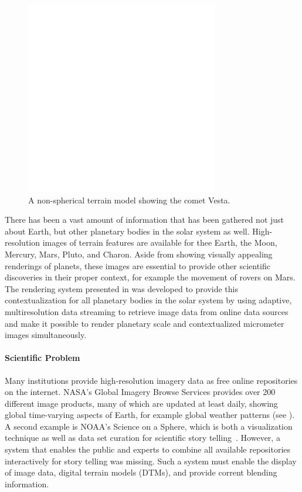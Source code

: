 \begin{figure}
\centering
\includegraphics[width=0.75\textwidth]{figures/empty.png}
\caption{A non-spherical terrain model showing the comet Vesta.}
\label{contributions:astro:gb:vesta}
\end{figure}

There has been a vast amount of information that has been gathered not just about Earth, but other planetary bodies in the solar system as well.  High-resolution images of terrain features are available for thee Earth, the Moon, Mercury, Mars, Pluto, and Charon.  Aside from showing visually appealing renderings of planets, these images are essential to provide other scientific discoveries in their proper context, for example the movement of rovers on Mars.  The rendering system presented in  was developed to provide this contextualization for all planetary bodies in the solar system by using adaptive, multiresolution data streaming to retrieve image data from online data sources and make it possible to render planetary scale and contextualized micrometer images simultaneously.


\paragraph{Scientific Problem} \label{contributions:astro:gb:problem}
Many institutions provide high-resolution imagery data as free online repositories on the internet.  NASA's Global Imagery Browse Services provides over 200 different image products, many of which are updated at least daily, showing global time-varying aspects of Earth, for example global weather patterns (see ).  A second example is NOAA's Science on a Sphere, which is both a visualization technique as well as data set curation for scientific story telling~\cite{ma2012scientific}.  However, a system that enables the public and experts to combine all available repositories interactively for story telling was missing.  Such a system must enable the display of image data, digital terrain models (DTMs), and provide corrent blending information.

